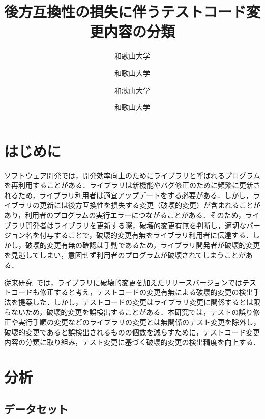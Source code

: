 \documentclass[uplatex,dvipdfmx,a4paper,twocolumn,base=11pt,jbase=11pt,ja=standard]{bxjsarticle}  %
\title{後方互換性の損失に伴うテストコード変更内容の分類}{A classification of test code changes accompanied by a lack of backward compatibility}
\author{和歌山大学}{前川　大樹}{Daiki Maekawa, Wakayama University}
\author{和歌山大学}{伊原　彰紀}{Akinori Ihara, Wakayama University}
\author{和歌山大学}{大森　楓己}{Fuki Omori, Wakayama University}
\author{和歌山大学}{才木　一也}{Kazuya Saiki, Wakayama University}
\begin{document}
\maketitle

\section{はじめに}

ソフトウェア開発では，開発効率向上のためにライブラリと呼ばれるプログラムを再利用することがある．ライブラリは新機能やバグ修正のために頻繁に更新されるため，ライブラリ利用者は適宜アップデートをする必要がある．しかし，ライブラリの更新には後方互換性を損失する変更（破壊的変更）が含まれることがあり，利用者のプログラムの実行エラーにつながることがある．そのため，ライブラリ開発者はライブラリを更新する際，破壊的変更有無を判断し，適切なバージョン名を付与することで，破壊的変更有無をライブラリ利用者に伝達する．しかし，破壊的変更有無の確認は手動であるため，ライブラリ開発者が破壊的変更を見逃してしまい，意図せず利用者のプログラムが破壊されてしまうことがある．

従来研究~\cite{FOSE2021_Matsuda}では，ライブラリに破壊的変更を加えたリリースバージョンではテストコードも修正すると考え，テストコードの変更有無による破壊的変更の検出手法を提案した．しかし，テストコードの変更はライブラリ変更に関係するとは限らないため，破壊的変更を誤検出することがある．本研究では，テストの誤り修正や実行手順の変更などのライブラリの変更とは無関係のテスト変更を除外し，破壊的変更であると誤検出されるものの個数を減らすために，テストコード変更内容の分類に取り組み，テスト変更に基づく破壊的変更の検出精度を向上する．

\section{分析}
\subsection{データセット}
\end{document}
